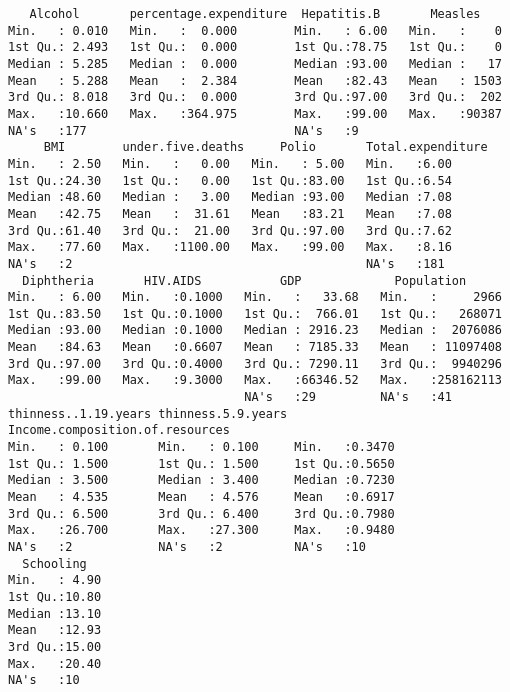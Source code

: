 \documentclass[11pt]{article}
\begin{document}
\begin{verbatim}
   Alcohol       percentage.expenditure  Hepatitis.B       Measles     
Min.   : 0.010   Min.   :  0.000        Min.   : 6.00   Min.   :    0  
1st Qu.: 2.493   1st Qu.:  0.000        1st Qu.:78.75   1st Qu.:    0  
Median : 5.285   Median :  0.000        Median :93.00   Median :   17  
Mean   : 5.288   Mean   :  2.384        Mean   :82.43   Mean   : 1503  
3rd Qu.: 8.018   3rd Qu.:  0.000        3rd Qu.:97.00   3rd Qu.:  202  
Max.   :10.660   Max.   :364.975        Max.   :99.00   Max.   :90387  
NA's   :177                             NA's   :9                      
     BMI        under.five.deaths     Polio       Total.expenditure
Min.   : 2.50   Min.   :   0.00   Min.   : 5.00   Min.   :6.00     
1st Qu.:24.30   1st Qu.:   0.00   1st Qu.:83.00   1st Qu.:6.54     
Median :48.60   Median :   3.00   Median :93.00   Median :7.08     
Mean   :42.75   Mean   :  31.61   Mean   :83.21   Mean   :7.08     
3rd Qu.:61.40   3rd Qu.:  21.00   3rd Qu.:97.00   3rd Qu.:7.62     
Max.   :77.60   Max.   :1100.00   Max.   :99.00   Max.   :8.16     
NA's   :2                                         NA's   :181      
  Diphtheria       HIV.AIDS           GDP             Population       
Min.   : 6.00   Min.   :0.1000   Min.   :   33.68   Min.   :     2966  
1st Qu.:83.50   1st Qu.:0.1000   1st Qu.:  766.01   1st Qu.:   268071  
Median :93.00   Median :0.1000   Median : 2916.23   Median :  2076086  
Mean   :84.63   Mean   :0.6607   Mean   : 7185.33   Mean   : 11097408  
3rd Qu.:97.00   3rd Qu.:0.4000   3rd Qu.: 7290.11   3rd Qu.:  9940296  
Max.   :99.00   Max.   :9.3000   Max.   :66346.52   Max.   :258162113  
                                 NA's   :29         NA's   :41         
thinness..1.19.years thinness.5.9.years Income.composition.of.resources
Min.   : 0.100       Min.   : 0.100     Min.   :0.3470                 
1st Qu.: 1.500       1st Qu.: 1.500     1st Qu.:0.5650                 
Median : 3.500       Median : 3.400     Median :0.7230                 
Mean   : 4.535       Mean   : 4.576     Mean   :0.6917                 
3rd Qu.: 6.500       3rd Qu.: 6.400     3rd Qu.:0.7980                 
Max.   :26.700       Max.   :27.300     Max.   :0.9480                 
NA's   :2            NA's   :2          NA's   :10                     
  Schooling    
Min.   : 4.90  
1st Qu.:10.80  
Median :13.10  
Mean   :12.93  
3rd Qu.:15.00  
Max.   :20.40  
NA's   :10     
\end{verbatim}
\end{document}
